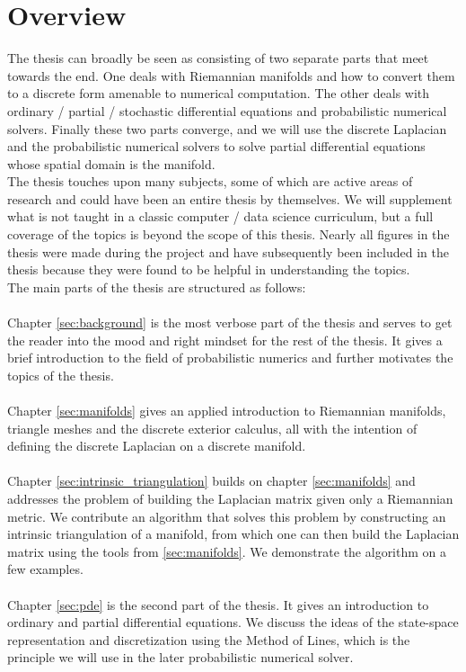 \section{Overview}\label{sec:overview}
The thesis can broadly be seen as consisting of two separate parts that meet towards the end. One deals with Riemannian manifolds and how to convert them to a discrete form amenable to numerical computation. The other deals with ordinary / partial / stochastic differential equations and probabilistic numerical solvers. Finally these two parts converge, and we will use the discrete Laplacian and the probabilistic numerical solvers to solve partial differential equations whose spatial domain is the manifold.
\\
The thesis touches upon many subjects, some of which are active areas of research and could have been an entire thesis by themselves. We will supplement what is not taught in a classic computer / data science curriculum, but a full coverage of the topics is beyond the scope of this thesis. Nearly all figures in the thesis were made during the project and have subsequently been included in the thesis because they were found to be helpful in understanding the topics. 
\\The main parts of the thesis are structured as follows:
\\\\
Chapter \ref{sec:background} is the most verbose part of the thesis and serves to get the reader into the mood and right mindset for the rest of the thesis. It gives a brief introduction to the field of probabilistic numerics and further motivates the topics of the thesis.
\\\\
Chapter \ref{sec:manifolds} gives an applied introduction to Riemannian manifolds, triangle meshes and the discrete exterior calculus, all with the intention of defining the discrete Laplacian on a discrete manifold.
\\\\
Chapter \ref{sec:intrinsic_triangulation} builds on chapter \ref{sec:manifolds} and addresses the problem of building the Laplacian matrix given only a Riemannian metric. We contribute an algorithm that solves this problem by constructing an intrinsic triangulation of a manifold, from which one can then build the Laplacian matrix using the tools from \ref{sec:manifolds}. We demonstrate the algorithm on a few examples.
\\\\
Chapter \ref{sec:pde} is the second part of the thesis. It gives an introduction to ordinary and partial differential equations. We discuss the ideas of the state-space representation and discretization using the Method of Lines, which is the principle we will use in the later probabilistic numerical solver.
